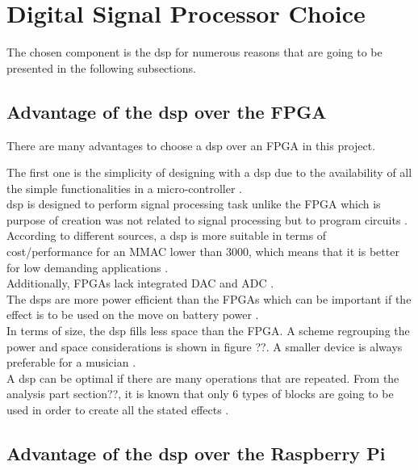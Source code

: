 \section{Digital Signal Processor Choice}

The chosen component is the \gls{dsp} for numerous reasons that are going to be presented in the following subsections.

\subsection{Advantage of the \gls{dsp} over the FPGA}

There are many advantages to choose a \gls{dsp} over an FPGA in this project. 

The first one is the simplicity of designing with a \gls{dsp} due to the availability of all the simple functionalities in a micro-controller \citep{eetimes}. \\

\gls{dsp} is designed to perform signal processing task unlike the FPGA which is purpose of creation was not related to signal processing but to program circuits \citep{eetimes}. \\

According to different sources, a \gls{dsp} is more suitable in terms of cost/performance for an MMAC lower than 3000, which means that it is better for low demanding applications \citep{eetimes}. \\

Additionally, FPGAs lack integrated DAC and ADC \citep{eetimes}. \\

The \gls{dsp}s are more power efficient than the FPGAs which can be important if the effect is to be used on the move on battery power \citep{rtcmag}. \\

In terms of size, the \gls{dsp} fills less space than the FPGA. A scheme regrouping the power and space considerations is shown in figure ??.  A smaller device is always preferable for a musician \citep{offchip}. \\

A \gls{dsp} can be optimal if there are many operations that are repeated. From the analysis part section??, it is known that only 6 types of blocks are going to be used in order to create all the stated effects \citep{eetimes} \citep{hunteng}. \\

\subsection{Advantage of the \gls{dsp} over the Raspberry Pi}





